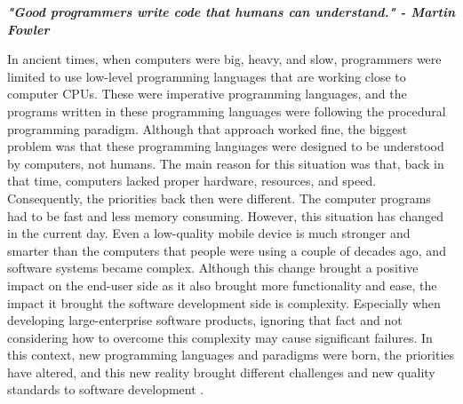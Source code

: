 \textbf{\textit{"Good programmers write code that humans can understand." - Martin Fowler}} \cite{21}

In ancient times, when computers were big, heavy, and slow, programmers were limited to use low-level programming languages that are working close to computer CPUs. These were imperative programming languages, and the programs written in these programming languages were following the procedural programming paradigm. Although that approach worked fine, the biggest problem was that these programming languages were designed to be understood by computers, not humans. The main reason for this situation was that, back in that time, computers lacked proper hardware, resources, and speed. Consequently, the priorities back then were different. The computer programs had to be fast and less memory consuming. However, this situation has changed in the current day. Even a low-quality mobile device is much stronger and smarter than the computers that people were using a couple of decades ago, and software systems became complex. Although this change brought a positive impact on the end-user side as it also brought more functionality and ease, the impact it brought the software development side is complexity. Especially when developing large-enterprise software products, ignoring that fact and not considering how to overcome this complexity may cause significant failures. In this context, new programming languages and paradigms were born, the priorities have altered, and this new reality brought different challenges and new quality standards to software development \cite{12}.

